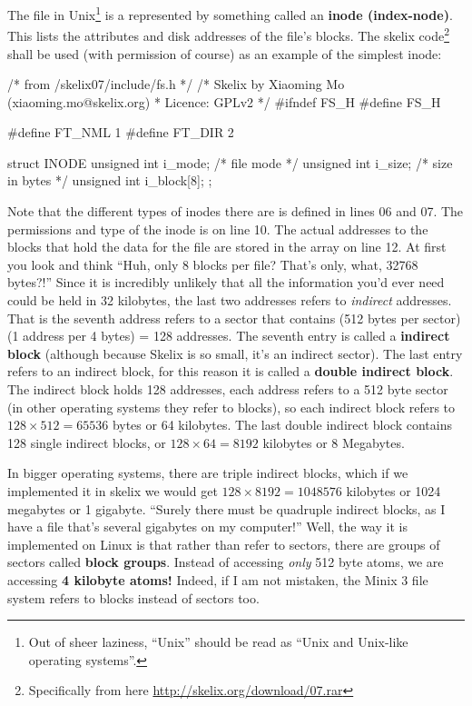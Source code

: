 The file in Unix\footnote{Out of sheer laziness, ``Unix'' should be read as ``Unix and Unix-like operating systems''.} is a represented by something called an \textbf{inode (index-node)}. This lists the attributes and disk addresses of the file's blocks. The skelix code\footnote{Specifically from here \url{http://skelix.org/download/07.rar}} shall be used (with permission of course) as an example of the simplest inode:
\begin{code}[numbers=left,firstnumber=1]
/* from /skelix07/include/fs.h */
/* Skelix by Xiaoming Mo (xiaoming.mo@skelix.org)
 * Licence: GPLv2 */
#ifndef FS_H
#define FS_H

#define FT_NML    1
#define FT_DIR    2

struct INODE {
	unsigned int i_mode;        /* file mode */
	unsigned int i_size;        /* size in bytes */
	unsigned int i_block[8];
};
\end{code}
Note that the different types of inodes there are is defined in lines 06 and 07. The permissions and type of the inode is on line 10. The actual addresses to the blocks that hold the data for the file are stored in the array on line 12. At first you look and think ``Huh, only 8 blocks per file? That's only, what, 32768 bytes?!'' Since it is incredibly unlikely that all the information you'd ever need could be held in 32 kilobytes, the last two addresses refers to \textit{indirect} addresses. That is the seventh address refers to a sector that contains (512 bytes per sector)(1 address per 4 bytes) = 128 addresses. The seventh entry is called a \textbf{indirect block} (although because Skelix is so small, it's an indirect sector). The last entry refers to an indirect block, for this reason it is called a \textbf{double indirect block}. The indirect block holds 128 addresses, each address refers to a 512 byte sector (in other operating systems they refer to blocks), so each indirect block refers to $128\times 512 = 65536$ bytes or 64 kilobytes. The last double indirect block contains 128 single indirect blocks, or $128\times 64 = 8192$ kilobytes or 8 Megabytes.

In bigger operating systems, there are triple indirect blocks, which if we implemented it in skelix we would get $128\times 8192 = 1048576$ kilobytes or 1024 megabytes or 1 gigabyte. ``Surely there must be quadruple indirect blocks, as I have a file that's several gigabytes on my computer!'' Well, the way it is implemented on Linux is that rather than refer to sectors, there are groups of sectors called \textbf{block groups}. Instead of accessing \textit{only} 512 byte atoms, we are accessing \textbf{4 kilobyte atoms!} Indeed, if I am not mistaken, the Minix 3 file system refers to blocks instead of sectors too.

